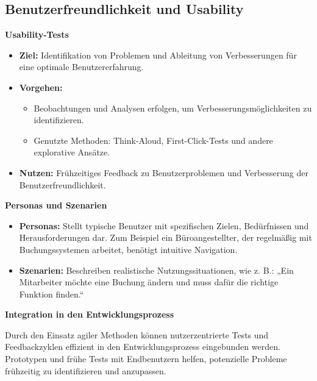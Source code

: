 \newpage

\subsection{Benutzerfreundlichkeit und Usability}

\textbf{Usability-Tests}
\begin{itemize}
	\item \textbf{Ziel:} Identifikation von Problemen und Ableitung von Verbesserungen für eine optimale Benutzererfahrung. \textit{\cite{ux_usability}}
	\item \textbf{Vorgehen:} 
	\begin{itemize}
		\item Beobachtungen und Analysen erfolgen, um Verbesserungsmöglichkeiten zu identifizieren. \textit{\cite{ux_usability}}
		\item Genutzte Methoden: Think-Aloud, First-Click-Tests und andere explorative Ansätze. \textit{\cite{ux_usability}}
	\end{itemize}
	\item \textbf{Nutzen:} Frühzeitiges Feedback zu Benutzerproblemen und Verbesserung der Benutzerfreundlichkeit. \textit{\cite{ux_usability}}
\end{itemize}


\textbf{Personas und Szenarien}
\begin{itemize}
	\item \textbf{Personas:} Stellt typische Benutzer mit spezifischen Zielen, Bedürfnissen und Herausforderungen dar. Zum Beispiel ein Büroangestellter, der regelmäßig mit Buchungssystemen arbeitet, benötigt intuitive Navigation. \textit{\cite{ux_usability}}
	\item \textbf{Szenarien:} Beschreiben realistische Nutzungssituationen, wie z. B.: „Ein Mitarbeiter möchte eine Buchung ändern und muss dafür die richtige Funktion finden.“ \textit{\cite{ux_usability}}
\end{itemize}

\textbf{Integration in den Entwicklungsprozess}

Durch den Einsatz agiler Methoden können nutzerzentrierte Tests und Feedbackzyklen effizient in den Entwicklungsprozess eingebunden werden. Prototypen und frühe Tests mit Endbenutzern helfen, potenzielle Probleme frühzeitig zu identifizieren und anzupassen.